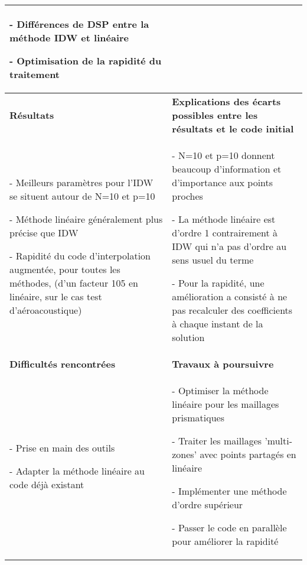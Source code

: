 \begin{table}[ht]
\begin{tabular}{|p{6.5cm}|p{8.5cm}|}
{\begin{minipage}[t]{14cm}
- Différences de DSP entre la méthode IDW et linéaire

- Optimisation de la rapidité du traitement
\hspace{0.5cm}
\end{minipage}
} \\ 
\hline
\textbf{Résultats} & \textbf{Explications des écarts possibles entre les résultats et le code initial} \\ 
\hline
\begin{minipage}[t]{6.5cm}

- Meilleurs paramètres pour l'IDW se situent autour de N=10 et p=10

- Méthode linéaire généralement plus précise que IDW

- Rapidité du code d'interpolation augmentée, pour toutes les méthodes, (d'un facteur 105 en linéaire, sur le cas test d'aéroacoustique)

\end{minipage} & 
\begin{minipage}[t]{8.5cm}

- N=10 et p=10 donnent beaucoup d'information et d'importance aux points proches

- La méthode linéaire est d'ordre 1 contrairement à IDW qui n'a pas d'ordre au sens usuel du terme

- Pour la rapidité, une amélioration a consisté à ne pas recalculer des coefficients à chaque instant de la solution

\end{minipage} \\ 
\hline
\textbf{Difficultés rencontrées} & \textbf{Travaux à poursuivre} \\ 
\hline
\begin{minipage}[t]{6.5cm}
- Prise en main des outils

- Adapter la méthode linéaire au code déjà existant
\end{minipage} & 
\begin{minipage}[t]{8.5cm}
- Optimiser la méthode linéaire pour les maillages prismatiques

- Traiter les maillages 'multi-zones' avec points partagés en linéaire

- Implémenter une méthode d'ordre supérieur

- Passer le code en parallèle pour améliorer la rapidité


\end{minipage} \\ 
\hline
\end{tabular}
\end{table}  
\newpage
